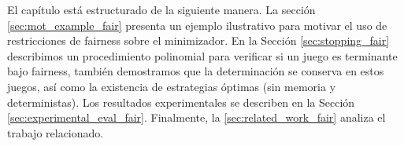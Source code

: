 

El capítulo está estructurado de la siguiente manera. La sección \ref{sec:mot_example_fair} presenta un ejemplo ilustrativo para motivar el uso de restricciones de fairness sobre el minimizador.
En la Sección \ref{sec:stopping_fair} describimos un procedimiento polinomial para verificar si un juego es terminante bajo fairness,
también demostramos que la determinación se conserva en estos juegos, así como la existencia de estrategias óptimas (sin memoria y deterministas).
Los resultados experimentales se describen en la Sección \ref{sec:experimental_eval_fair}.
Finalmente, la \ref{sec:related_work_fair} analiza el trabajo relacionado.

